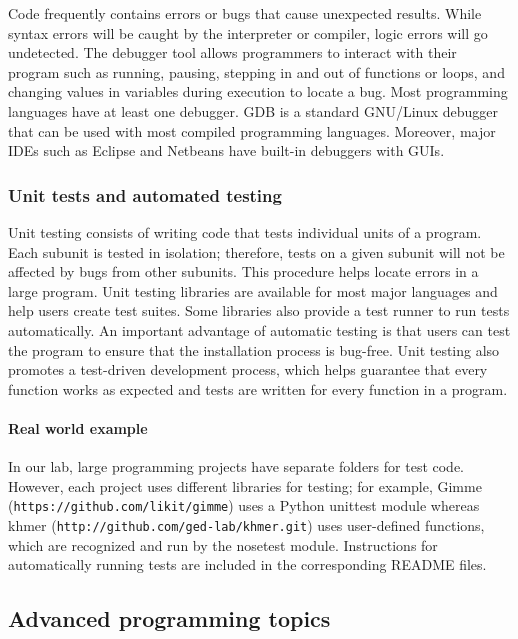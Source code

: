 \documentclass[ChapterTOCs,krantz2]{krantz} %
\begin{document}
Code frequently contains errors or bugs that cause unexpected results.
While syntax errors will be caught by the interpreter or compiler, 
logic errors will go undetected.
The debugger tool allows programmers to interact with their program such as
running, pausing, stepping in and out of functions or loops, and changing values
in variables during execution to locate a bug.
Most programming languages have at least one debugger.
GDB is a standard GNU/Linux debugger that can be used with most
compiled programming languages.
Moreover, major IDEs such as Eclipse and Netbeans have built-in debuggers
with GUIs. 

\subsubsection{Unit tests and automated testing}

Unit testing consists of writing
code that tests individual units of a program. 
Each subunit is tested in isolation; therefore, tests 
on a given subunit will not be affected by bugs from other subunits. This
procedure helps locate errors in a large program. 
Unit testing libraries are available for most major languages
and help users create test
suites. Some libraries also
provide a test runner to run tests automatically. An important
advantage of automatic testing is that users can
test the program to ensure that the installation process is bug-free.  Unit
testing also promotes a test-driven development process, which 
helps guarantee that
every function works as expected and tests are written for every function in a
program.

\paragraph{Real world example}

In our lab,
large programming projects have separate folders for test code. However, each project uses
different libraries for testing; for example, Gimme
(\texttt{https://github.com/likit/gimme}) uses a Python unittest module whereas khmer
(\texttt{http://github.com/ged-lab/khmer.git}) uses user-defined functions, which are
recognized and run by the nosetest module. Instructions for automatically
running tests are included in the corresponding README
files.

\subsection{Advanced programming topics}
\end{document}
